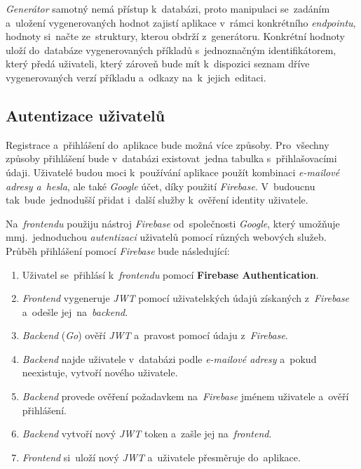 \documentclass[11pt,a4paper]{report}
\begin{document}
            \emph{Generátor} samotný nemá přístup k~databázi, proto manipulaci se~zadáním a~uložení vygenerovaných hodnot zajistí aplikace v~rámci konkrétního \emph{endpointu}, hodnoty si~načte ze~struktury, kterou obdrží z~generátoru. Konkrétní hodnoty uloží do~databáze vygenerovaných příkladů s~jednoznačným identifikátorem, který předá uživateli, který zároveň bude mít k~dispozici seznam dříve vygenerovaných verzí příkladu a~odkazy na~k~jejich~editaci.

        \subsection{Autentizace uživatelů}
            Registrace a~přihlášení do~aplikace bude možná více způsoby. Pro~všechny způsoby přihlášení bude v~databázi existovat~jedna tabulka s~přihlašovacími údaji. Uživatelé budou moci k~používání aplikace použít kombinaci \emph{e-mailové adresy a~hesla}, ale také \emph{Google} účet, díky použití \emph{Firebase}. V~budoucnu tak~bude~jednodušší přidat i~další služby k~ověření identity uživatele.
            
            Na~\emph{frontendu} použiju nástroj \emph{Firebase} od~společnosti \emph{Google}, který umožňuje mmj.~jednoduchou \emph{autentizaci} uživatelů pomocí různých webových služeb. Průběh přihlášení pomocí \emph{Firebase} bude následující:
            \begin{enumerate}
                \item Uživatel se~přihlásí k~\emph{frontendu} pomocí \textbf{Firebase Authentication}.
                \item \emph{Frontend} vygeneruje \emph{JWT} pomocí uživatelských údajů získaných z~\emph{Firebase} a~odešle jej~na~\emph{backend}.
                \item \emph{Backend} (\emph{Go}) ověří \emph{JWT} a~pravost pomocí údaju z~\emph{Firebase}.
                \item \emph{Backend} najde uživatele v~databázi podle \emph{e-mailové adresy} a~pokud neexistuje, vytvoří nového uživatele.
                \item \emph{Backend} provede ověření požadavkem na~\emph{Firebase} jménem uživatele a~ověří přihlášení.
                \item \emph{Backend} vytvoří nový \emph{JWT} token a~zašle jej na~\emph{frontend}.
                \item \emph{Frontend} si~uloží nový \emph{JWT} a~uživatele přesměruje do~aplikace.
            \end{enumerate}
            
\end{document}
